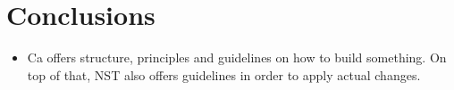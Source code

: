 \chapter{Conclusions} \label{chap_conclusions}


\begin{itemize}
    \item Ca offers structure, principles and guidelines on how to build something. On top
    of that, NST also offers guidelines in order to apply actual changes.
\end{itemize}